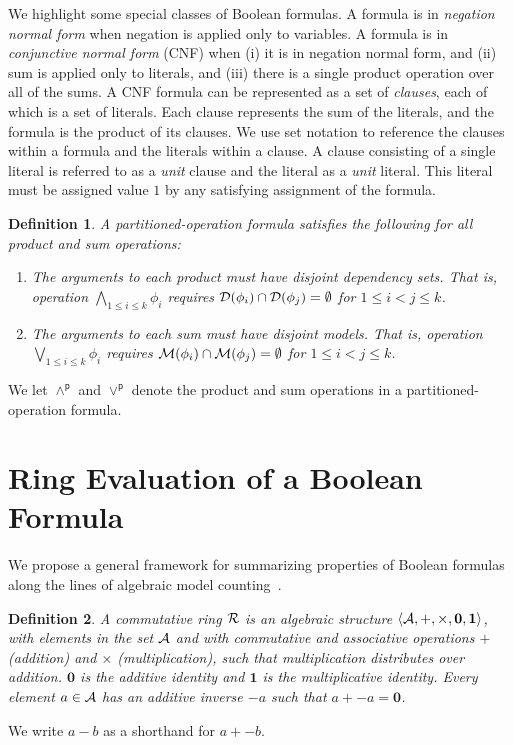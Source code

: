 \documentclass[twoside,11pt]{article}
\newcommand{\pand}{\mathbin{\land^\textsf{p}}}
\newcommand{\por}{\mathbin{\lor^\textsf{p}}}
\newcommand{\dependencyset}{{\cal D}}
\newcommand{\ring}{{\cal R}}
\newcommand{\dset}{{\cal A}}
\newcommand{\radd}{+}
\newcommand{\rmul}{\times}
\newcommand{\addident}{\textbf{0}}
\newcommand{\mulident}{\textbf{1}}
\newcommand{\modelset}{{\cal M}}
\newtheorem{dfn}{Definition}
\begin{document}
  We highlight some special classes of Boolean formulas.  A formula is
  in \emph{negation normal form} when negation is applied only to
  variables.  A formula is in \emph{conjunctive normal form} (CNF)
  when (i) it is in negation normal form, and (ii) sum is applied only
  to literals, and (iii) there is a single product operation over all
  of the sums.  A CNF formula can be represented as a set of
  \emph{clauses}, each of which is a set of literals.  Each clause
  represents the sum of the literals, and the formula is the product
  of its clauses.  We use set notation to reference the clauses within
  a formula and the literals within a clause.  A clause consisting of
  a single literal is referred to as a \emph{unit} clause and the
  literal as a \emph{unit} literal.  This literal must be assigned
  value $1$ by any satisfying assignment of the formula.

\begin{dfn}
  \label{def:partitioned-operation-formula}
  A \emph{partitioned-operation formula}
 satisfies the following for all product and sum operations:
      \begin{enumerate}
      \item The arguments to each product must have disjoint dependency sets.  That is, operation
        $\bigwedge_{1 \leq i \leq k} \phi_i$ requires $\dependencyset(\phi_i) \cap \dependencyset(\phi_j) = \emptyset$ for $1 \leq i < j \leq k$.
      \item The arguments to each sum must have disjoint models.  That is, operation
        $\bigvee_{1 \leq i \leq k} \phi_i$ requires $\modelset(\phi_i) \cap \modelset(\phi_j) = \emptyset$ for $1 \leq i < j \leq k$.
      \end{enumerate}
\end{dfn}
     We let $\pand$ and $\por$ denote the product and sum operations in a partitioned-operation formula.

  \section{Ring Evaluation of a Boolean Formula}

We propose a general framework for summarizing properties of Boolean
formulas along the lines of algebraic model counting~\cite{kimmig:jal:2017}.

\begin{dfn}
  A \emph{commutative ring} $\ring$ is an algebraic structure
  $\langle \dset, \radd, \rmul, \addident, \mulident \rangle$,
  with elements in the set $\dset$ and with commutative and
  associative operations $\radd$ (addition) and $\rmul$ (multiplication),
  such that multiplication distributes
  over addition.  $\addident$ is the additive identity and $\mulident$ is
  the multiplicative identity.  Every element $a \in \dset$ has an
  \emph{additive inverse} $-a$ such that $a + -a = \addident$.
\label{def:ring}
\end{dfn}
We write $a - b$ as a shorthand for $a + -b$.
\end{document}
